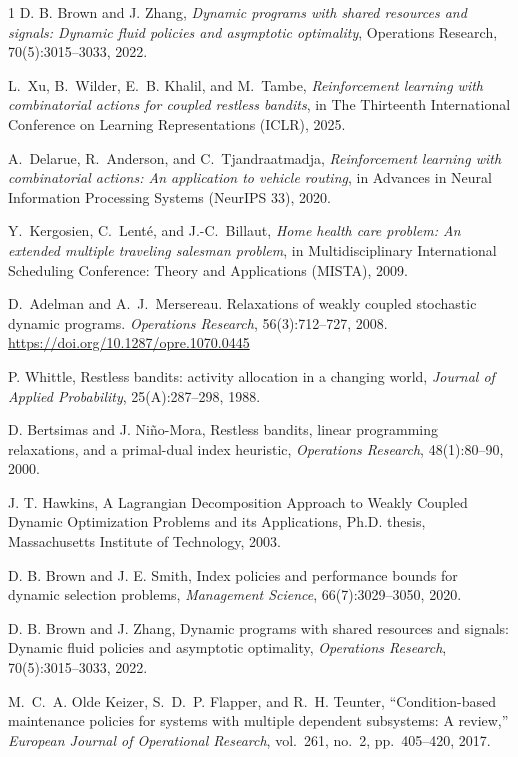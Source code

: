 \documentclass{article}
\begin{document}
\begin{thebibliography}{1}
D. B. Brown and J. Zhang, \textit{Dynamic programs with shared resources and signals: Dynamic fluid policies and asymptotic optimality}, Operations Research, 70(5):3015--3033, 2022.

 L.~Xu, B.~Wilder, E.~B. Khalil, and M.~Tambe, \emph{Reinforcement learning with combinatorial actions for coupled restless bandits}, in The Thirteenth International Conference on Learning Representations (ICLR), 2025.

 A.~Delarue, R.~Anderson, and C.~Tjandraatmadja, \emph{Reinforcement learning with combinatorial actions: An application to vehicle routing}, in Advances in Neural Information Processing Systems (NeurIPS 33), 2020.

 Y.~Kergosien, C.~Lent\'{e}, and J.-C.~Billaut, \emph{Home health care problem: An extended multiple traveling salesman problem}, in Multidisciplinary International Scheduling Conference: Theory and Applications (MISTA), 2009.

D.~Adelman and A.~J.~Mersereau.
\newblock Relaxations of weakly coupled stochastic dynamic programs.
\newblock \textit{Operations Research}, 56(3):712--727, 2008.
\newblock \url{https://doi.org/10.1287/opre.1070.0445}

P. Whittle, Restless bandits: activity allocation in a changing world, \textit{Journal of Applied Probability}, 25(A):287--298, 1988.

D. Bertsimas and J. Ni\~{n}o-Mora, Restless bandits, linear programming relaxations, and a primal-dual index heuristic, \textit{Operations Research}, 48(1):80--90, 2000.

J. T. Hawkins, A Lagrangian Decomposition Approach to Weakly Coupled Dynamic Optimization Problems and its Applications, Ph.D. thesis, Massachusetts Institute of Technology, 2003.

D. B. Brown and J. E. Smith, Index policies and performance bounds for dynamic selection problems, \textit{Management Science}, 66(7):3029--3050, 2020.

D. B. Brown and J. Zhang, Dynamic programs with shared resources and signals: Dynamic fluid policies and asymptotic optimality, \textit{Operations Research}, 70(5):3015--3033, 2022.

M.~C.~A. Olde Keizer, S.~D.~P. Flapper, and R.~H. Teunter,
``Condition-based maintenance policies for systems with multiple
dependent subsystems: A review,'' \emph{European Journal of
Operational Research}, vol.~261, no.~2, pp.~405--420, 2017.


\end{thebibliography}
\end{document}
